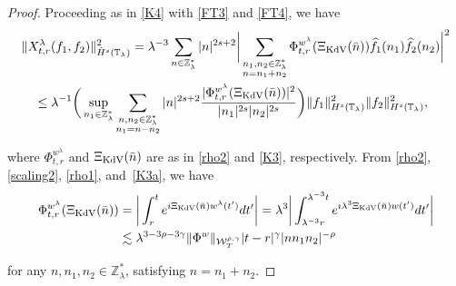\documentclass[letterpaper, 11pt,  reqno]{amsart}
\newcommand{\1}{\hspace{0.5mm}\text{I}\hspace{0.5mm}}
\newcommand{\noi}{\noindent}
\newcommand{\Z}{\mathbb{Z}}
\newcommand{\T}{\mathbb{T}}
\newcommand{\g}{\gamma}
\newcommand{\ld}{\lambda}
\newcommand{\ft}{\widehat}
\newcommand{\les}{\lesssim}
\newcommand{\W}{\mathcal{W}}
\newcommand{\KDV}{\text{\rm KdV} }
\numberwithin{equation}{section}
\numberwithin{theorem}{section}
\begin{document}
\begin{proof}

Proceeding as in 
\eqref{K4} with \eqref{FT3} and \eqref{FT4}, we have 
\begin{align}
\begin{aligned}
& \|X^{\ld}_{t,r}(f_1,f_2) \|^2_{\dot H^s(\T_\ld)}
=  \ld^{-3} 
\sum_{n\in\Z_\ld^*} |n|^{2s+ 2}
\bigg |  \sum_{ \substack{n_1, n_2 \in \Z_\ld^*\\n = n_1+n_2}}
\Phi^{w^\ld}_{t,r}(\Xi_\KDV(\bar n) ) 
\ft f_1(n_1)  \ft f_2 (n_2)  \bigg|^2 \\
&\quad \leq \ld^{-1}
\bigg(\sup_{n_1 \in \Z_\ld^*}
\sum_{\substack{n, n_2 \in \Z_\ld^*\\n_1 = n - n_2}} 
|n|^{2s+ 2}
\frac{|\Phi^{w^\ld}_{t,r} (\Xi_\KDV(\bar n)) |^2}{|n_1|^{2s}|n_2|^{2s}} \bigg)
\|f_1\|_{H^s(\T_\ld)}^2
\|f_2\|_{H^s(\T_\ld)}^2, 
\end{aligned}
\label{D2}
\end{align}


\noi
where $\Phi^{w^\ld}_{t,r}$ and
$\Xi_\KDV(\bar n)$ 
are 
 as in \eqref{rho2} and \eqref{K3}, 
 respectively.
From \eqref{rho2}, 
\eqref{scaling2}, 
\eqref{rho1}, and~\eqref{K3a}, 
we have
\begin{align}
\begin{aligned}
\Phi^{w^\ld}_{t,r} (\Xi_\KDV(\bar n)) 
& = \bigg| 
\int_{r}^{t}  e^{i  \Xi_\KDV (\bar n) w^{\ld}(t') } d t'
\bigg|
= \ld^3   \bigg|  \int_{\ld^{-3}r}^{\ld^{-3}t} 
e^{i  \ld^3  \Xi_\KDV(\bar n)  w(t') } dt'  \bigg|  \\
& \les 
\ld^{3- 3\rho -3\g} 
 \|\Phi^{w}  \|_{\W_{T}^{\rho, \g}}
 |t-r|^{\g} 
 |n n_1 n_2|^{-\rho}
\end{aligned}
\label{D3}
\end{align} 




\noi
 for any $n, n_1, n_2\in \Z_\ld^*$,  satisfying $n = n_1+ n_2$.




\end{proof}
\end{document}
